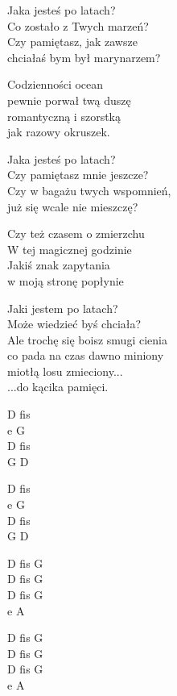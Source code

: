 \begin{text}
    Jaka jesteś po latach?\\
    Co zostało z Twych marzeń?\\
    Czy pamiętasz, jak zawsze\\
    chciałaś bym był marynarzem?

    Codzienności ocean\\
    pewnie porwał twą duszę\\
    romantyczną i szorstką\\
    jak razowy okruszek.

    Jaka jesteś po latach?\\
    Czy pamiętasz mnie jeszcze?\\
    Czy w bagażu twych wspomnień,\\
    już się wcale nie mieszczę?

    Czy też czasem o zmierzchu\\
    W tej magicznej godzinie\\
    Jakiś znak zapytania\\
    w moją stronę popłynie

    Jaki jestem po latach?\\
    Może wiedzieć byś chciała?\\
    Ale trochę się boisz smugi cienia\\
    co pada na czas dawno miniony\\
    miotłą losu zmieciony...\\
    ...do kącika pamięci.
\end{text}
\begin{chord}
    D fis\\
    e G\\
    D fis\\
    G D

    D fis\\
    e G\\
    D fis\\
    G D

    D fis G\\
    D fis G\\
    D fis G\\
    e A

    D fis G\\
    D fis G\\
    D fis G\\
    e A
\end{chord}